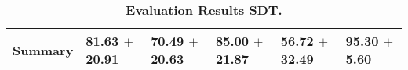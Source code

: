 \begin{table}[htb]
{\begin{tabular}{llllll}
\midrule
\textbf{Summary                                  } &                  \phantom{0}81.63 $\pm$ 20.91 &                      \phantom{0}70.49 $\pm$ 20.63 &                  \phantom{0}85.00 $\pm$ 21.87 &                  \phantom{0}56.72 $\pm$ 32.49 &  \phantom{0}95.30 $\pm$ \phantom{0}5.60 \\
\bottomrule
\end{tabular}%
}
\caption{\textbf{Evaluation Results SDT.}}
\label{tab:eval-results}
\end{table}


